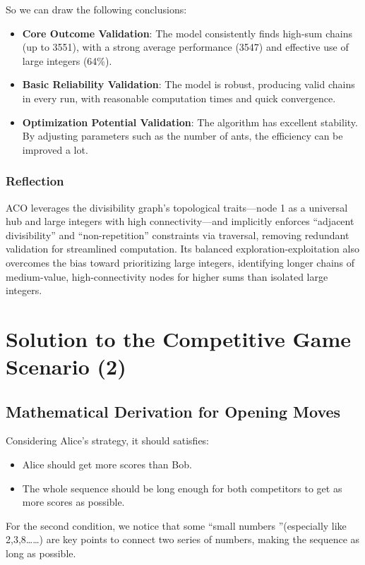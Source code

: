 \documentclass[twocolumn, a4paper]{article}
\begin{document}
So we can draw the following conclusions:
\begin{itemize}
    \item \textbf{Core Outcome Validation}: The model consistently finds high-sum chains (up to 3551), with a strong average performance (3547) and effective use of large integers (64\%).
    \item \textbf{Basic Reliability Validation}: The model is robust, producing valid chains in every run, with reasonable computation times and quick convergence.
    \item \textbf{Optimization Potential Validation}: The algorithm has excellent stability. By adjusting parameters such as the number of ants, the efficiency can be improved a lot.
\end{itemize}
\subsubsection{Reflection}
ACO leverages the divisibility graph's topological traits—node 1 as a universal hub and large integers with high connectivity—and implicitly enforces ``adjacent divisibility'' and ``non-repetition'' constraints via traversal, removing redundant validation for streamlined computation. Its balanced exploration-exploitation also overcomes the bias toward prioritizing large integers, identifying longer chains of medium-value, high-connectivity nodes for higher sums than isolated large integers.




\section{Solution to the Competitive Game Scenario (2)}
\subsection{Mathematical Derivation for Opening Moves}

Considering Alice's strategy, it should satisfies: 
\begin{itemize}
    \item Alice should get more scores than Bob.
    \item The whole sequence should be long enough for both competitors to get as more scores as possible.
\end{itemize}

For the second condition, we notice that some ``small numbers ''(especially like 2,3,8……) are key points to connect two series of numbers, making the sequence as long as possible.
\end{document}
